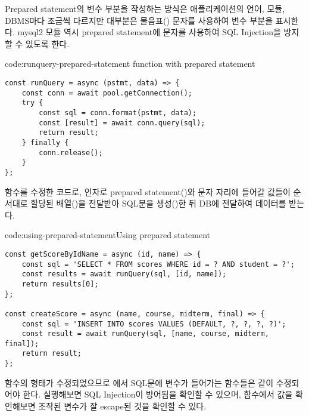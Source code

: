 Prepared statement의 변수 부분을 작성하는 방식은 애플리케이션의 언어, 모듈, DBMS마다 조금씩 다르지만 대부분은 물음표() 문자를 사용하여 변수 부분을 표시한다. mysql2 모듈 역시 prepared statement에  문자를 사용하여 SQL Injection을 방지할 수 있도록 한다.

\begin{code}{code:runquery-prepared-statement}{ function with prepared statement}
\begin{verbatim}
const runQuery = async (pstmt, data) => {
    const conn = await pool.getConnection();
    try {
        const sql = conn.format(pstmt, data);
        const [result] = await conn.query(sql);
        return result;
    } finally {
        conn.release();
    }
};
\end{verbatim}
\end{code}

\는  함수를 수정한 코드로, 인자로 prepared statement()와  문자 자리에 들어갈 값들이 순서대로 할당된 배열()을 전달받아 SQL문을 생성()한 뒤 DB에 전달하여 데이터를 받는다.

\begin{code}{code:using-prepared-statement}{Using prepared statement}
\begin{verbatim}
const getScoreByIdName = async (id, name) => {
    const sql = 'SELECT * FROM scores WHERE id = ? AND student = ?';
    const results = await runQuery(sql, [id, name]);
    return results[0];
};

const createScore = async (name, course, midterm, final) => {
    const sql = 'INSERT INTO scores VALUES (DEFAULT, ?, ?, ?, ?)';
    const result = await runQuery(sql, [name, course, midterm, final]);
    return result;
};
\end{verbatim}
\end{code}

 함수의 형태가 수정되었으므로 에서 SQL문에 변수가 들어가는 함수들은 \와 같이 수정되어야 한다. \과 \을 실행해보면 SQL Injection이 방어됨을 확인할 수 있으며,  함수에서  값을 확인해보면 조작된 변수가 잘 escape된 것을 확인할 수 있다.
